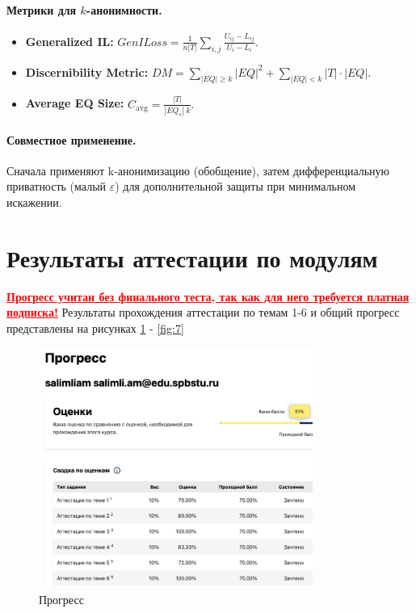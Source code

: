 \documentclass[areasetadvanced]{scrartcl}
\newcommand{\rmavg}{\mathrm{avg}}
\begin{document}
\paragraph{Метрики для $k$-анонимности.}
\begin{itemize}
  \item \textbf{Generalized IL:}
    \(\displaystyle GenILoss=\frac1{n|T|}\sum_{i,j}\frac{U_{ij}-L_{ij}}{U_i-L_i}.\)
  \item \textbf{Discernibility Metric:}
    \(\displaystyle DM=\sum_{|EQ|\ge k}|EQ|^2+\sum_{|EQ|<k}|T|\cdot|EQ|.\)
  \item \textbf{Average EQ Size:}
    \(\displaystyle C_{\rmavg}=\frac{|T|}{|EQ_s|\;k}.\)
\end{itemize}       

\paragraph{Совместное применение.}  
Сначала применяют k-анонимизацию (обобщение), затем дифференциальную приватность (малый $\varepsilon$) для дополнительной защиты при минимальном искажении.

\newpage
\section{Результаты аттестации по модулям}
\textcolor{red}{\textbf{\uline{Прогресс учитан без финального теста, так как для него требуется платная подписка!}}}
Результаты прохождения аттестации по темам 1-6 и общий прогресс представлены на рисунках \ref{fig:1} - \ref{fig:7}

\begin{figure}[H]
    \centering
    \includegraphics[width=0.8\textwidth]{images/111.png}
    \caption{Прогресс}
    \label{fig:1}
\end{figure}
\end{document}
